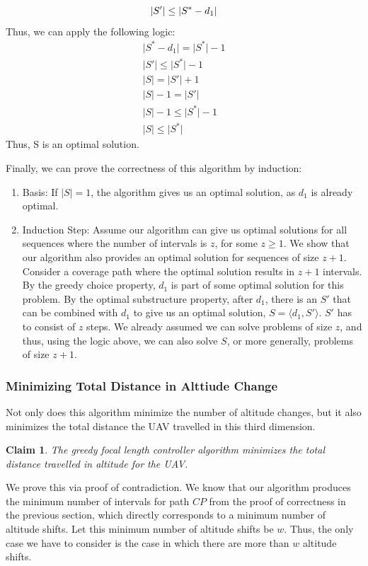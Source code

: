 \documentclass[conference]{IEEEtran}
\theoremstyle{plain}%
\newtheorem{claim}{Claim}
\begin{document}
\begin{equation*}
\lvert S' \rvert \leq \lvert S^* - d_1 \rvert \\
\end{equation*}
Thus, we can apply the following logic:
\begin{gather*}
\lvert S^* - d_1 \rvert = \lvert S^* \rvert -1 \\
\lvert S' \rvert \leq \lvert S^* \rvert -1 \\
\lvert S \rvert = \lvert S' \rvert + 1 \\
\lvert S \rvert -1 = \lvert S' \rvert \\
\lvert S \rvert -1 \leq \lvert S^* \rvert -1 \\
\lvert S \rvert \leq \lvert S^* \rvert 
\end{gather*}
Thus, S is an optimal solution.

Finally, we can prove the correctness of this algorithm by induction:
\begin{enumerate}
\item Basis: If $\lvert S \rvert = 1$, the algorithm gives us an optimal solution, as $d_1$ is already optimal.
\item Induction Step: Assume our algorithm can give us optimal solutions for all sequences where the number of intervals is $z$, for some $z \geq 1$. We show that our algorithm also provides an optimal solution for sequences of size $z+1$. Consider a coverage path where the optimal solution results in $z+1$ intervals. By the greedy choice property, $d_1$ is part of some optimal solution for this problem. By the optimal substructure property, after $d_1$, there is an $S'$ that can be combined with $d_1$ to give us an optimal solution, $S=\langle d_1, S' \rangle$. $S'$ has to consist of $z$ steps. We already assumed we can solve problems of size $z$, and thus, using the logic above, we can also solve $S$, or more generally, problems of size $z+1$.
\end{enumerate}

\subsubsection{Minimizing Total Distance in Alttiude Change}
Not only does this algorithm minimize the number of altitude changes, but it also minimizes the total distance the UAV travelled in this third dimension.
\begin{claim} %
The greedy focal length controller algorithm minimizes the total distance travelled in altitude for the UAV.
\end{claim}
We prove this via proof of contradiction. We know that our algorithm produces the minimum number of intervals for path $CP$ from the proof of correctness in the previous section, which directly corresponds to a minimum number of altitude shifts. Let this minimum number of altitude shifts be $w$. Thus, the only case we have to consider is the case in which there are more than $w$ altitude shifts.
\end{document}
